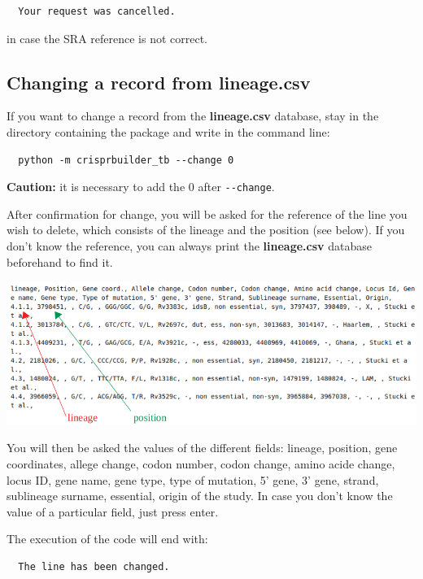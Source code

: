 \documentclass[twoside,a4paper,11pt,frenchb,openany]{report}
\begin{document}
    \begin{verbatim}
  Your request was cancelled.
\end{verbatim}

    in case the SRA reference is not correct.


    \subsection{Changing a record from
lineage.csv}\label{changing-a-record-from-lineage.csv}

    If you want to change a record from the \textbf{lineage.csv} database,
stay in the directory containing the package and write in the command
line:

    \begin{verbatim}
  python -m crisprbuilder_tb --change 0
\end{verbatim}

    \textbf{Caution:} it is necessary to add the 0 after
\texttt{-\/-change}.

After confirmation for change, you will be asked for the reference of
the line you wish to delete, which consists of the lineage and the
position (see below). If you don't know the reference, you can always
print the \textbf{lineage.csv} database beforehand to find it.

\includegraphics[width=16cm]{selection.png}

    You will then be asked the values of the different fields: lineage,
position, gene coordinates, allege change, codon number, codon change,
amino acide change, locus ID, gene name, gene type, type of mutation, 5'
gene, 3' gene, strand, sublineage surname, essential, origin of the
study. In case you don't know the value of a particular field, just
press enter.

    The execution of the code will end with:

    \begin{verbatim}
  The line has been changed.
\end{verbatim}
\end{document}
